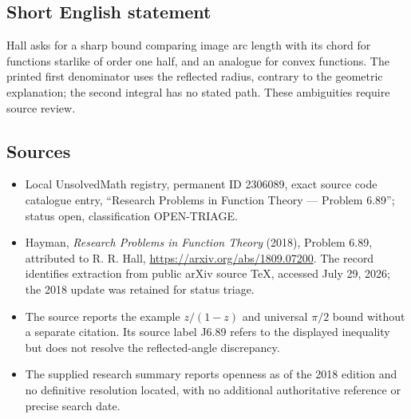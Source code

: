 \documentclass[11pt]{article}
\begin{document}
\subsection{Short English statement}
Hall asks for a sharp bound comparing image arc length with its chord for functions starlike of order one half, and an analogue for convex functions. The printed first denominator uses the reflected radius, contrary to the geometric explanation; the second integral has no stated path. These ambiguities require source review.
\subsection{Sources}
\begin{itemize}
\item Local UnsolvedMath registry, permanent ID 2306089, exact source code catalogue entry, ``Research Problems in Function Theory --- Problem 6.89''; status open, classification OPEN-TRIAGE.
\item Hayman, \emph{Research Problems in Function Theory} (2018), Problem 6.89, attributed to R. R. Hall, \url{https://arxiv.org/abs/1809.07200}. The record identifies extraction from public arXiv source TeX, accessed July 29, 2026; the 2018 update was retained for status triage.
\item The source reports the example $z/(1-z)$ and universal $\pi/2$ bound without a separate citation. Its source label J6.89 refers to the displayed inequality but does not resolve the reflected-angle discrepancy.
\item The supplied research summary reports openness as of the 2018 edition and no definitive resolution located, with no additional authoritative reference or precise search date.
\end{itemize}
\end{document}
